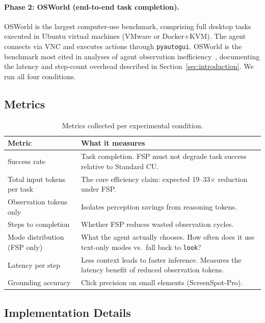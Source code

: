 \documentclass[11pt,a4paper]{article}
\begin{document}
\paragraph{Phase 2: OSWorld (end-to-end task completion).}
OSWorld \cite{osworld} is the largest computer-use benchmark, comprising full desktop tasks executed in Ubuntu virtual machines (VMware or Docker+KVM). The agent connects via VNC and executes actions through \texttt{pyautogui}. OSWorld is the benchmark most cited in analyses of agent observation inefficiency~\cite{osworld-human}, documenting the latency and step-count overhead described in Section~\ref{sec:introduction}. We run all four conditions.

\subsection{Metrics}

\begin{table}[h]
\centering
\caption{Metrics collected per experimental condition.}
\label{tab:metrics}
\begin{tabular}{lp{8.5cm}}
\toprule
\textbf{Metric} & \textbf{What it measures} \\
\midrule
Success rate & Task completion. FSP must not degrade task success relative to Standard CU. \\
Total input tokens per task & The core efficiency claim: expected 19--33$\times$ reduction under FSP. \\
Observation tokens only & Isolates perception savings from reasoning tokens. \\
Steps to completion & Whether FSP reduces wasted observation cycles. \\
Mode distribution (FSP only) & What the agent actually chooses. How often does it use text-only modes vs.\ fall back to \texttt{look}? \\
Latency per step & Less context leads to faster inference. Measures the latency benefit of reduced observation tokens. \\
Grounding accuracy & Click precision on small elements (ScreenSpot-Pro). \\
\bottomrule
\end{tabular}
\end{table}

\subsection{Implementation Details}
\end{document}

